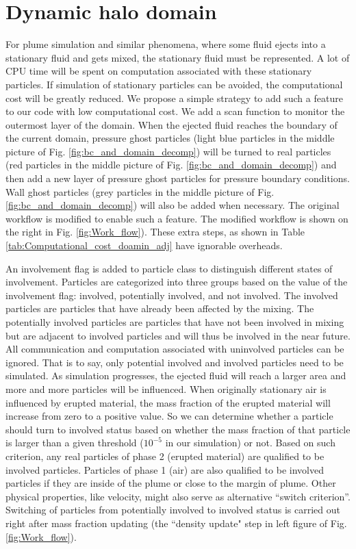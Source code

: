 \section{Dynamic halo domain} 
For plume simulation and similar phenomena, where some fluid ejects into a stationary fluid and gets mixed, the stationary fluid must be represented.
A lot of CPU time will be spent on computation associated with these stationary particles. If simulation of stationary particles can be avoided, the computational cost will be greatly reduced.
We propose a simple strategy to add such a feature to our code with low computational cost. We add a scan function to monitor the outermost layer of the domain. When the ejected fluid reaches the boundary of the current domain, pressure ghost particles (light blue particles in the middle picture of Fig. \ref{fig:bc_and_domain_decomp}) will be turned to real particles (red particles in the middle picture of Fig. \ref{fig:bc_and_domain_decomp}) and then add a new layer of pressure ghost particles for pressure boundary conditions. Wall ghost particles (grey particles in the middle picture of Fig. \ref{fig:bc_and_domain_decomp}) will also be added when necessary. The original workflow is modified to enable such a feature. The modified workflow is shown on the right in Fig. \ref{fig:Work_flow}). These extra steps, as shown in Table \ref{tab:Computational_cost_doamin_adj} have ignorable overheads.

An involvement flag is added to particle class to distinguish different states of involvement. Particles are categorized into three groups based on the value of the involvement flag: involved, potentially involved, and not involved. The involved particles are particles that have already been affected by the mixing. The potentially involved particles are particles that have not been involved in mixing but are adjacent to involved particles and will thus be involved in the near future. 
All communication and computation associated with uninvolved particles can be ignored. That is to say, only potential involved and involved particles need to be simulated.
As simulation progresses, the ejected fluid will reach a larger area and more and more particles will be influenced. When originally stationary air is influenced by erupted material, the mass fraction of the erupted material will increase from zero to a positive value. So we can determine whether a particle should turn to involved status based on whether the mass fraction of that particle is larger than a given threshold ($10^{-5} $ in our simulation) or not. Based on such criterion, any real particles of phase 2 (erupted material) are qualified to be involved particles.  Particles of phase 1 (air) are also qualified to be involved particles if they are inside of the plume or close to the margin of plume. Other physical properties, like velocity, might also serve as alternative ``switch criterion''. Switching of particles from potentially involved to involved status is carried out right after mass fraction updating (the ``density update" step in left figure of Fig. \ref{fig:Work_flow}).

